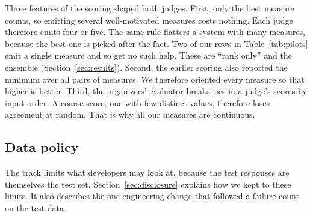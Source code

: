 Three features of the scoring shaped both judges. First, only the best measure
counts, so emitting several well-motivated measures costs nothing. Each judge
therefore emits four or five. The same rule flatters a system with many
measures, because the best one is picked after the fact. Two of our rows in Table~\ref{tab:pilots} emit a single measure and so get no such help. These are ``rank only'' and the ensemble (Section~\ref{sec:results}).
Second, the earlier scoring also reported the minimum over all pairs of measures.
We therefore oriented every measure so that higher is better. Third, the
organizers' evaluator breaks ties in a judge's scores by input order. A coarse
score, one with few distinct values, therefore loses agreement at random. That is
why all our measures are continuous.

\subsection{Data policy}

The track limits what developers may look at, because the test responses are
themselves the test set. Section~\ref{sec:disclosure} explains how we kept to these limits. It also describes the one engineering change that followed a failure count on the test data.
